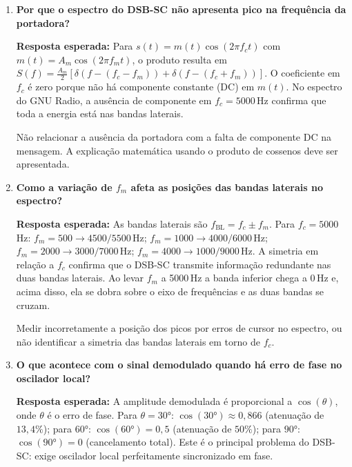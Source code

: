 \documentclass[11pt,a4paper]{article}
\begin{document}
\begin{enumerate}[label=\textbf{Q\arabic*.}, leftmargin=*, itemsep=1em]

  \item \textbf{Por que o espectro do DSB-SC não apresenta pico na frequência da portadora?}

    \textbf{Resposta esperada:} Para $s(t) = m(t)\cos(2\pi f_c t)$ com
    $m(t) = A_m\cos(2\pi f_m t)$, o produto resulta em
    $S(f) = \tfrac{A_m}{2}[\delta(f-(f_c-f_m)) + \delta(f-(f_c+f_m))]$.
    O coeficiente em $f_c$ é zero porque não há componente constante (DC) em $m(t)$.
    No espectro do GNU Radio, a ausência de componente em $f_c = 5000$\,Hz confirma
    que toda a energia está nas bandas laterais.

    \begin{nota}
      Não relacionar a ausência da portadora com a falta de componente DC na mensagem.
      A explicação matemática usando o produto de cossenos deve ser apresentada.
    \end{nota}

  \item \textbf{Como a variação de $f_m$ afeta as posições das bandas laterais no espectro?}

    \textbf{Resposta esperada:} As bandas laterais são $f_\text{BL} = f_c \pm f_m$.
    Para $f_c = 5000$\,Hz: $f_m=500 \to 4500/5500$\,Hz; $f_m=1000 \to 4000/6000$\,Hz;
    $f_m=2000 \to 3000/7000$\,Hz; $f_m=4000 \to 1000/9000$\,Hz. A simetria em relação
    a $f_c$ confirma que o DSB-SC transmite informação redundante nas duas bandas
    laterais.  Ao levar $f_m$ a 5000\,Hz a banda inferior chega a 0\,Hz e, acima
    disso, ela se dobra sobre o eixo de frequências e as duas bandas se cruzam.

    \begin{nota}
      Medir incorretamente a posição dos picos por erros de cursor no espectro, ou não
      identificar a simetria das bandas laterais em torno de $f_c$.
    \end{nota}

  \item \textbf{O que acontece com o sinal demodulado quando há erro de fase no oscilador local?}

    \textbf{Resposta esperada:} A amplitude demodulada é proporcional a $\cos(\theta)$,
    onde $\theta$ é o erro de fase. Para $\theta=30°$: $\cos(30°) \approx 0{,}866$
    (atenuação de $13{,}4\%$); para $60°$: $\cos(60°) = 0{,}5$ (atenuação de $50\%$);
    para $90°$: $\cos(90°) = 0$ (cancelamento total). Este é o principal problema do
    DSB-SC: exige oscilador local perfeitamente sincronizado em fase.


\end{enumerate}
\end{document}
